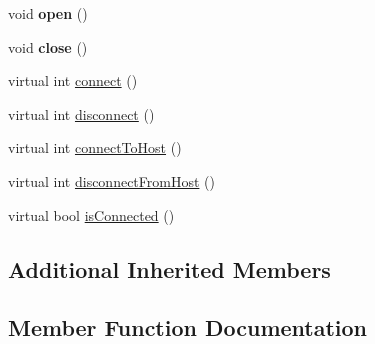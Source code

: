 \begin{DoxyCompactItemize}
\item 
\mbox{\label{classwood_box_1_1communication_1_1wifi_1_1_e_s_p8266_wi_fi_communicator_a8bf593dd2b78572988c240b57cc9c5c8}} 
void {\bfseries open} ()
\item 
\mbox{\label{classwood_box_1_1communication_1_1wifi_1_1_e_s_p8266_wi_fi_communicator_ae8188b06891b3fd0e21312b3e69910d4}} 
void {\bfseries close} ()
\item 
virtual int \mbox{\hyperlink{classwood_box_1_1communication_1_1wifi_1_1_e_s_p8266_wi_fi_communicator_ab3e1f12a851dc3ed6eb487c39178cb6f}{connect}} ()
\item 
virtual int \mbox{\hyperlink{classwood_box_1_1communication_1_1wifi_1_1_e_s_p8266_wi_fi_communicator_af30a81a7f279c11241b3df0878289af0}{disconnect}} ()
\item 
virtual int \mbox{\hyperlink{classwood_box_1_1communication_1_1wifi_1_1_e_s_p8266_wi_fi_communicator_a0875cf7209c48069d22270eaeb2cac0f}{connect\+To\+Host}} ()
\item 
virtual int \mbox{\hyperlink{classwood_box_1_1communication_1_1wifi_1_1_e_s_p8266_wi_fi_communicator_a5a407734df1ae47ac32575fa6346cfd4}{disconnect\+From\+Host}} ()
\item 
virtual bool \mbox{\hyperlink{classwood_box_1_1communication_1_1wifi_1_1_e_s_p8266_wi_fi_communicator_a66b7f8adaae85dbf94062b1cd472d98a}{is\+Connected}} ()
\end{DoxyCompactItemize}
\subsection*{Additional Inherited Members}


\subsection{Member Function Documentation}
\mbox{\label{classwood_box_1_1communication_1_1wifi_1_1_e_s_p8266_wi_fi_communicator_aa73f46aaaf5441b79dd4a15be293aeb4}} 
